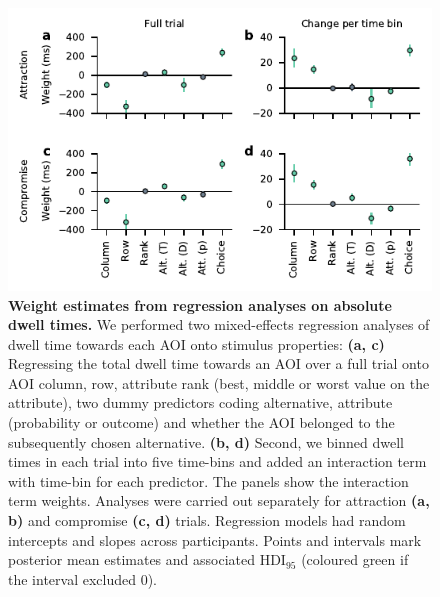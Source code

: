\documentclass[11pt, a4paper]{article}
\begin{document}
\begin{figure}
\includegraphics[scale=1]{../figures/S_dwell-regression_weights.pdf}
\caption{\textbf{Weight estimates from regression analyses on absolute dwell times.} We performed two mixed-effects regression analyses of dwell time towards each AOI onto stimulus properties: \textbf{(a, c)} Regressing the total dwell time towards an AOI over a full trial onto AOI column, row, attribute rank (best, middle or worst value on the attribute), two dummy predictors coding alternative, attribute (probability or outcome) and whether the AOI belonged to the subsequently chosen alternative. \textbf{(b, d)} Second, we binned dwell times in each trial into five time-bins and added an interaction term with time-bin for each predictor. The panels show the interaction term weights. Analyses were carried out separately for attraction \textbf{(a, b)} and compromise \textbf{(c, d)} trials. Regression models had random intercepts and slopes across participants. Points and intervals mark posterior mean estimates and associated HDI$_{95}$ (coloured green if the interval excluded 0).}
\label{fig:dwell-regression-weights}
\end{figure}
\end{document}
